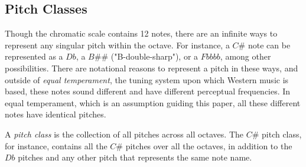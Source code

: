 \subsection{Pitch Classes}

Though the chromatic scale contains 12 notes, there are an infinite ways to represent any singular pitch within the octave. For instance, a $C\#$ note can be represented as a $Db$, a $B\#\#$ ("B-double-sharp"), or a $Fbbbb$, among other possibilities. There are notational reasons to represent a pitch in these ways, and outside of \textit{equal temperament}, the tuning system upon which Western music is based, these notes sound different and have different perceptual frequencies. In equal temperament, which is an assumption guiding this paper, all these different notes have identical pitches.

A \textit{pitch class} is the collection of all pitches across all octaves. The $C\#$ pitch class, for instance, contains all the $C\#$ pitches over all the octaves, in addition to the $Db$ pitches and any other pitch that represents the same note name.